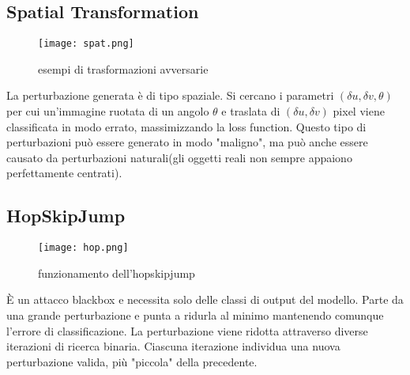 \subsection{Spatial Transformation}
\begin{figure}[h]
    \texttt{[image: spat.png]}
    \caption{esempi di trasformazioni avversarie}
    \label{fig:spat}
\end{figure}
\cite{spatial}La perturbazione generata è di tipo spaziale. Si cercano i parametri $(\delta u,\delta v,\theta)$ per cui un'immagine ruotata di un angolo $\theta$ e traslata di 
$(\delta u, \delta v)$ pixel viene classificata in modo errato, massimizzando la loss function. Questo tipo di perturbazioni può essere generato in modo "maligno", ma può anche essere causato da perturbazioni naturali(gli oggetti reali
non sempre appaiono perfettamente centrati).
\subsection{HopSkipJump}
\begin{figure}[h]
    \texttt{[image: hop.png]}
    \caption{funzionamento dell'hopskipjump}
    \label{fig:hop}
\end{figure}
È un attacco blackbox e necessita solo delle classi di output del modello. Parte da una grande perturbazione e punta a ridurla al minimo mantenendo comunque l'errore di classificazione.
La perturbazione viene ridotta attraverso diverse iterazioni di ricerca binaria. Ciascuna iterazione individua una nuova perturbazione valida, più "piccola" della precedente.
